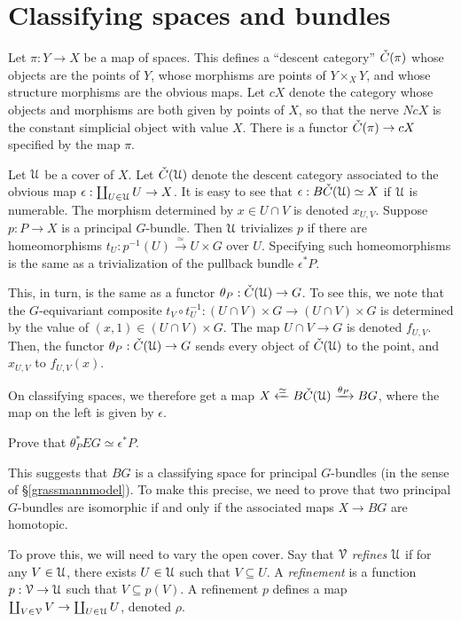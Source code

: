 \section{Classifying spaces and bundles}
Let $\pi:Y\to X$ be a map of spaces. This defines a ``descent category''
$\check{C}(\pi)$ whose objects are the points of $Y$, whose morphisms are points of
$Y\times_X Y$, and whose structure morphisms are the obvious maps. Let $cX$
denote the category whose objects and morphisms are both given by points of
$X$, so that the nerve $NcX$ is the constant simplicial object with value $X$.
There is a functor $\check{C}(\pi)\to cX$ specified by the map $\pi$. 

Let $\mathcal U$ be a cover of $X$. Let $\check{C}(\mathcal U)$ denote the descent category
associated to the obvious map $\epsilon:\coprod_{U\in \mathcal U} U\to X$. It is easy
to see that $\epsilon:B\check{C}(\mathcal U) \simeq X$ if $\mathcal U$ is numerable. The morphism
determined by $x\in U\cap V$ is denoted $x_{U,V}$. Suppose $p:P\to X$ is a
principal $G$-bundle.  Then $\mathcal U$ trivializes $p$ if there are homeomorphisms
$t_U:p^{-1}(U)\xrightarrow{\simeq} U\times G$ over $U$. Specifying such
homeomorphisms is the same as a trivialization of the pullback bundle
$\epsilon^\ast P$.

This, in turn, is the same as a functor $\theta_P:\check{C}(\mathcal U)\to G$. To
see this, we note that the $G$-equivariant composite $t_V\circ t_U^{-1}:(U\cap
V)\times G\to (U\cap V)\times G$ is determined by the value of $(x,1)\in (U\cap
V)\times G$. The map $U\cap V\to G$ is denoted $f_{U,V}$. Then, the functor
$\theta_P:\check{C}(\mathcal U)\to G$ sends every object of $\check{C}(\mathcal U)$ to the point, and
$x_{U,V}$ to $f_{U,V}(x)$.

On classifying spaces, we therefore get a map $X\xleftarrow{\simeq}
B\check{C}(\mathcal U)\xrightarrow{\theta_P} BG$, where the map on the left is given by
$\epsilon$.
\begin{exercise}
    Prove that $\theta_P^\ast EG \simeq \epsilon^\ast P$.
\end{exercise}
This suggests that $BG$ is a classifying space for principal $G$-bundles (in
the sense of \S \ref{grassmannmodel}). To make this precise, we need to prove
that two principal $G$-bundles are isomorphic if and only if the associated
maps $X\to BG$ are homotopic.

To prove this, we will need to vary the open cover. Say that $\mathcal V$
\emph{refines} $\mathcal U$ if for any $V\in \mathcal U$, there exists $U\in\mathcal U$ such that
$V\subseteq U$. A \emph{refinement} is a function $p:\mathcal V\to\mathcal U$ such that
$V\subseteq p(V)$. A refinement $p$ defines a map $\coprod_{V\in \mathcal V} V\to
\coprod_{U\in\mathcal U} U$, denoted $\rho$.

